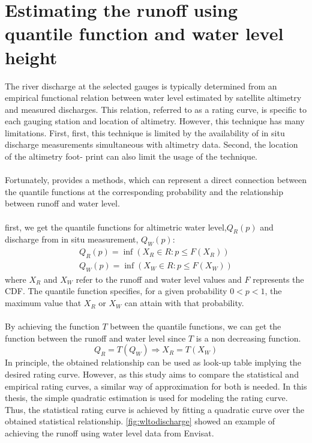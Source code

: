 \section{Estimating the runoff using quantile function and water level height}\label{sec:waterlevel}
The river discharge at the selected gauges is typically determined from an empirical functional relation between water level estimated by satellite altimetry and measured discharges. This relation, referred to as a rating curve, is specific to each gauging station and location of altimetry. However, this technique has many limitations. First, first, this technique is limited by the availability of in situ discharge measurements simultaneous with altimetry data. Second, the location of the altimetry foot- print can also limit the usage of the technique.\\\\
Fortunately, \cite{tourian2013quantile} provides a methods, which can represent a direct connection between the quantile functions at the corresponding probability and the relationship between runoff and water level. \\\\
first, we get the quantile functions for altimetric water level,$Q_R(p)$ and discharge from in situ measurement, $Q_W(p)$:
\begin{gather*}
	Q_R(p) = \inf(X_R \in R: p\leq F(X_R)) \\
	Q_W(p) = \inf(X_W \in R: p\leq F(X_W)) 
\end{gather*}
where $X_R$ and $X_W$ refer to the runoff and water level values and $F$ represents the CDF. The quantile function specifies, for a given probability $0 < p < 1$, the maximum value that $X_R$ or $X_W$ can attain with that probability.\\\\
By achieving the function $T$ between the quantile functions, we can get the function between the runoff and water level since $T$ is a non decreasing function. 
\begin{equation}
	Q_R = T(Q_W) \Longrightarrow X_R = T(X_W)
\end{equation}
In principle, the obtained relationship can be used as look-up table implying the desired rating curve. However, as this study aims to compare the statistical and empirical rating curves, a similar way of approximation for both is needed. In this thesis, the simple quadratic estimation is used for modeling the rating curve. Thus, the statistical rating curve is achieved by fitting a quadratic curve over the obtained statistical relationship. \autoref{fig:wltodischarge} showed an example of achieving the runoff using water level data from Envisat. 
